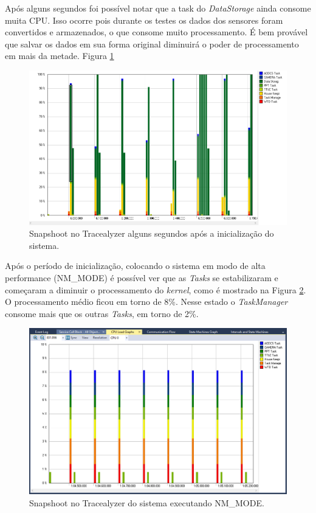 Após alguns segundos foi possível notar que a task do \textit{DataStorage} ainda consome muita CPU. Isso ocorre pois durante os testes os dados dos sensores foram convertidos e armazenados, o que consome muito processamento. É bem provável que salvar os dados em sua forma original diminuirá o poder de processamento em mais da metade. Figura \ref{trace_snapshoot_2}


\begin{figure}[h]
	\centering
	
	\includegraphics[keepaspectratio=true,scale=0.51]{figuras/trace_snapshoot_2.PNG}
	\caption{Snapshoot no Tracealyzer alguns segundos após a inicialização do sistema.}
	\label{trace_snapshoot_2}
\end{figure}
\FloatBarrier

Após o período de inicialização, colocando o sistema em modo de alta performance (NM\_MODE) é possível ver que as \textit{Tasks} se estabilizaram e começaram a diminuir o processamento do \textit{kernel}, como é mostrado na Figura \ref{trace_snapshoot_3}. O processamento médio ficou em torno de 8\%. Nesse estado o \textit{TaskManager} consome mais que os outras \textit{Tasks}, em torno de 2\%. 

\begin{figure}[h]
	\centering
	
	\includegraphics[keepaspectratio=true,scale=0.51]{figuras/trace_snapshoot_3.PNG}
	\caption{Snapshoot no Tracealyzer do sistema executando NM\_MODE.}
	\label{trace_snapshoot_3}
\end{figure}
\FloatBarrier

